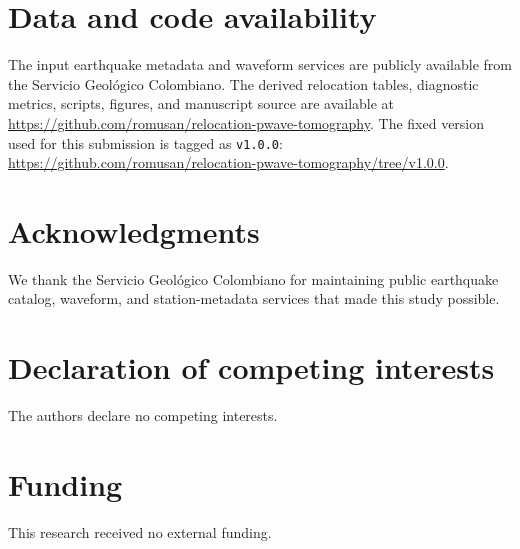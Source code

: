 \documentclass[review,authoryear]{elsarticle}
\begin{document}
\section*{Data and code availability}
\begin{sloppypar}
The input earthquake metadata and waveform services are publicly available from the Servicio Geol\'ogico Colombiano. The derived relocation tables, diagnostic metrics, scripts, figures, and manuscript source are available at \url{https://github.com/romusan/relocation-pwave-tomography}. The fixed version used for this submission is tagged as \texttt{v1.0.0}: \url{https://github.com/romusan/relocation-pwave-tomography/tree/v1.0.0}.
\end{sloppypar}

\section*{Acknowledgments}
We thank the Servicio Geol\'ogico Colombiano for maintaining public earthquake catalog, waveform, and station-metadata services that made this study possible.

\section*{Declaration of competing interests}
The authors declare no competing interests.

\section*{Funding}
This research received no external funding.



\end{document}
